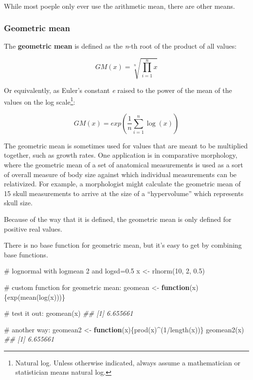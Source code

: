 \documentclass[
  13,
  letterpaper,
]{report}
\newenvironment{Shaded}{\begin{snugshade}}{\end{snugshade}}
\newcommand{\CommentTok}[1]{\textcolor[rgb]{0.37,0.37,0.37}{#1}}
\newcommand{\ControlFlowTok}[1]{\textcolor[rgb]{0.00,0.23,0.31}{\textbf{#1}}}
\newcommand{\DecValTok}[1]{\textcolor[rgb]{0.68,0.00,0.00}{#1}}
\newcommand{\DocumentationTok}[1]{\textcolor[rgb]{0.37,0.37,0.37}{\textit{#1}}}
\newcommand{\FloatTok}[1]{\textcolor[rgb]{0.68,0.00,0.00}{#1}}
\newcommand{\FunctionTok}[1]{\textcolor[rgb]{0.28,0.35,0.67}{#1}}
\newcommand{\NormalTok}[1]{\textcolor[rgb]{0.00,0.23,0.31}{#1}}
\newcommand{\OtherTok}[1]{\textcolor[rgb]{0.00,0.23,0.31}{#1}}
\newcommand{\SpecialCharTok}[1]{\textcolor[rgb]{0.37,0.37,0.37}{#1}}
\begin{document}
While most poeple only ever use the arithmetic mean, there are other
means.

\subsubsection{Geometric mean}\label{sec-06-cen-mean-gm}

The \textbf{geometric mean} is defined as the \emph{n}-th root of the
product of all values:

\[GM\left(x\right)=\sqrt[n]{\prod_{i=1}^{n}x}\]

Or equivalently, as Euler's constant \emph{e} raised to the power of the
mean of the values on the log scale\footnote{Natural log. Unless
  otherwise indicated, always assume a mathematician or statistician
  means natural log.}:

\[GM\left(x\right)=exp\left(\frac{1}{n}\sum_{i=1}^{n}\log{\left(x\right)}\right)\]

The geometric mean is sometimes used for values that are meant to be
multiplied together, such as growth rates. One application is in
comparative morphology, where the geometric mean of a set of anatomical
measurements is used as a sort of overall measure of body size against
which individual measurements can be relativized. For example, a
morphologist might calculate the geometric mean of 15 skull measurements
to arrive at the size of a ``hypervolume'' which represents skull size.

Because of the way that it is defined, the geometric mean is only
defined for positive real values.

There is no base function for geometric mean, but it's easy to get by
combining base functions.

\begin{Shaded}
\begin{Highlighting}[]

\CommentTok{\# lognormal with logmean 2 and logsd=0.5}
\NormalTok{x }\OtherTok{\textless{}{-}} \FunctionTok{rlnorm}\NormalTok{(}\DecValTok{10}\NormalTok{, }\DecValTok{2}\NormalTok{, }\FloatTok{0.5}\NormalTok{)}

\CommentTok{\# custom function for geometric mean:}
\NormalTok{geomean }\OtherTok{\textless{}{-}} \ControlFlowTok{function}\NormalTok{(x)\{}\FunctionTok{exp}\NormalTok{(}\FunctionTok{mean}\NormalTok{(}\FunctionTok{log}\NormalTok{(x)))\}}

\CommentTok{\# test it out:}
\FunctionTok{geomean}\NormalTok{(x)}
\DocumentationTok{\#\# [1] 6.655661}

\CommentTok{\# another way:}
\NormalTok{geomean2 }\OtherTok{\textless{}{-}} \ControlFlowTok{function}\NormalTok{(x)\{}\FunctionTok{prod}\NormalTok{(x)}\SpecialCharTok{\^{}}\NormalTok{(}\DecValTok{1}\SpecialCharTok{/}\FunctionTok{length}\NormalTok{(x))\}}
\FunctionTok{geomean2}\NormalTok{(x)}
\DocumentationTok{\#\# [1] 6.655661}
\end{Highlighting}
\end{Shaded}
\end{document}
